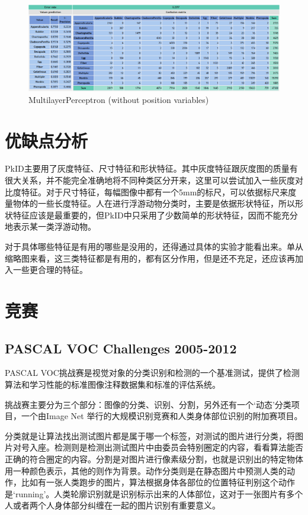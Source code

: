 \documentclass[12pt]{article}
\begin{document}
\begin{figure}[!ht]
\centering
\includegraphics[width=1.0\textwidth]{MultilayerPerceptron.png}
\caption{MultilayerPerceptron (without position variables)}
\label{fig: MultilayerPerceptron}
\end{figure} 

\section{优缺点分析}

PkID主要用了灰度特征、尺寸特征和形状特征。其中灰度特征跟灰度图的质量有很大关系，并不能完全准确地将不同种类区分开来，这里可以尝试加入一些灰度对比度特征。对于尺寸特征，每幅图像中都有一个5mm的标尺，可以依据标尺来度量物体的一些长度特征。人在进行浮游动物分类时，主要是依据形状特征，所以形状特征应该是最重要的，但PkID中只采用了少数简单的形状特征，因而不能充分地表示某一类浮游动物。

对于具体哪些特征是有用的哪些是没用的，还得通过具体的实验才能看出来。单从缩略图来看，这三类特征都是有用的，都有区分作用，但是还不充足，还应该再加入一些更合理的特征。


\section{竞赛}


\subsection{PASCAL VOC Challenges 2005-2012}

PASCAL VOC挑战赛是视觉对象的分类识别和检测的一个基准测试，提供了检测算法和学习性能的标准图像注释数据集和标准的评估系统。

挑战赛主要分为三个部分：图像的分类、识别、分割，另外还有一个‘动态’分类项目，一个由Image Net 举行的大规模识别竞赛和人类身体部位识别的附加赛项目。

分类就是让算法找出测试图片都是属于哪一个标签，对测试的图片进行分类，将图片对号入座。检测则是检测出测试图片中由委员会特别圈定的内容，看看算法能否正确的符合圈定的内容。分割是对图片进行像素级分割，也就是识别出的特定物体用一种颜色表示，其他的则作为背景。动作分类则是在静态图片中预测人类的动作，比如有一张人类跑步的图片，算法根据身体各部位的位置特征判别这个动作是‘running’。人类轮廓识别就是识别标示出来的人体部位，这对于一张图片有多个人或者两个人身体部分纠缠在一起的图片识别有重要意义。
\end{document}
